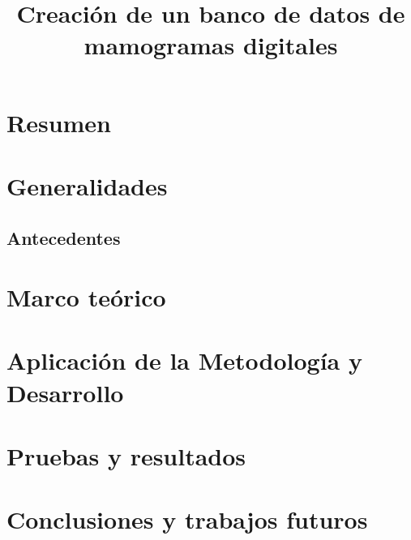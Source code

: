 \documentclass[11pt, a4paper, oneside]{book}
\begin{document}
\title{Creación de un banco de datos de mamogramas digitales}
\maketitle
\tableofcontents


\chapter{Resumen}
\chapter{Generalidades}
\section{Antecedentes}
\chapter{Marco teórico}
\chapter{Aplicación de la Metodología y Desarrollo}
\chapter{Pruebas y resultados}
\chapter{Conclusiones y trabajos futuros}
\end{document}

